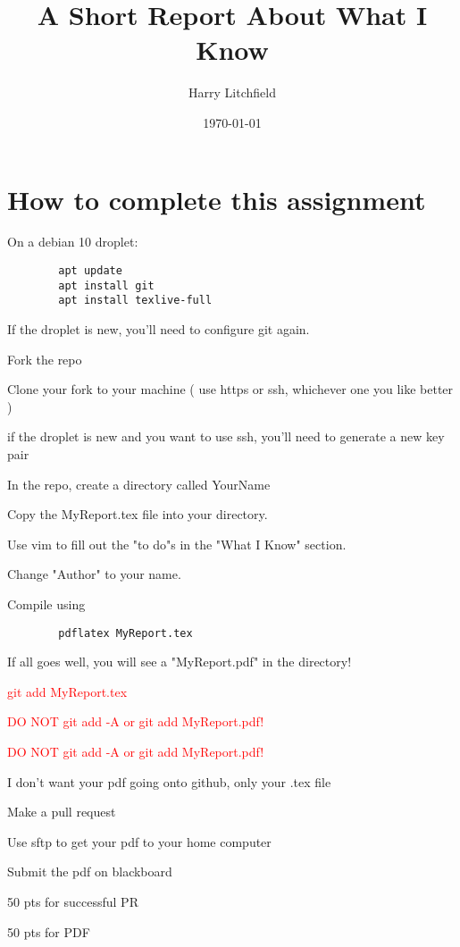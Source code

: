 \documentclass[11pt]{article}
\title{A Short Report About What I Know}
\author{ Harry Litchfield }
\date{\today}
\begin{document}
\maketitle	

\section*{How to complete this assignment}
\begin{todolist}
    \item On a debian 10 droplet:
    \begin{verbatim}
        apt update
        apt install git
        apt install texlive-full
    \end{verbatim}
    \item If the droplet is new, you'll need to configure git again.
    \item Fork the repo
    \item Clone your fork to your machine ( use https or ssh, whichever one you like better )
    \item if the droplet is new and you want to use ssh, you'll need to generate a new key pair
    \item In the repo, create a directory called YourName
    \item Copy the MyReport.tex file into your directory.
    \item Use vim to fill out the "to do"s in the "What I Know" section.
    \item Change "Author" to your name.
    \item Compile using
    \begin{verbatim}
        pdflatex MyReport.tex
    \end{verbatim}
    \item If all goes well, you will see a "MyReport.pdf" in the directory!
    \item \textcolor{red}{ git add MyReport.tex}
    \item {\Large\textcolor{red}{ DO NOT git add -A or git add MyReport.pdf!}}
    \item {\LARGE\textcolor{red}{ DO NOT git add -A or git add MyReport.pdf!}}
    \item I don't want your pdf going onto github, only your .tex  file
    \item Make a pull request
    \item Use sftp to get your pdf to your home computer
    \item Submit the pdf on blackboard
    \item 50 pts for successful PR
    \item 50 pts for PDF
\end{todolist}
\end{document}
